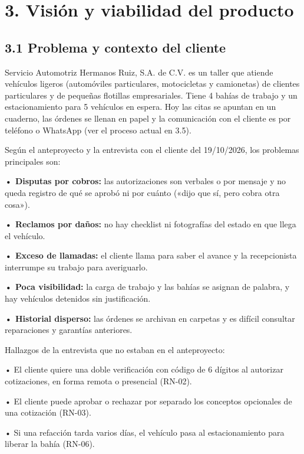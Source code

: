 \section{3. Visión y viabilidad del
producto}\label{visiuxf3n-y-viabilidad-del-producto}

\subsection{3.1 Problema y contexto del
cliente}\label{problema-y-contexto-del-cliente}

Servicio Automotriz Hermanos Ruiz, S.A. de C.V. es un taller que atiende
vehículos ligeros (automóviles particulares, motocicletas y camionetas)
de clientes particulares y de pequeñas flotillas empresariales. Tiene 4
bahías de trabajo y un estacionamiento para 5 vehículos en espera. Hoy
las citas se apuntan en un cuaderno, las órdenes se llenan en papel y la
comunicación con el cliente es por teléfono o WhatsApp (ver el proceso
actual en 3.5).

Según el anteproyecto y la entrevista con el cliente del 19/10/2026, los
problemas principales son:

\textbf{• Disputas por cobros:} las autorizaciones son verbales o por
mensaje y no queda registro de qué se aprobó ni por cuánto («dijo que
sí, pero cobra otra cosa»).

\textbf{• Reclamos por daños:} no hay checklist ni fotografías del
estado en que llega el vehículo.

\textbf{• Exceso de llamadas:} el cliente llama para saber el avance y
la recepcionista interrumpe su trabajo para averiguarlo.

\textbf{• Poca visibilidad:} la carga de trabajo y las bahías se asignan
de palabra, y hay vehículos detenidos sin justificación.

\textbf{• Historial disperso:} las órdenes se archivan en carpetas y es
difícil consultar reparaciones y garantías anteriores.

Hallazgos de la entrevista que no estaban en el anteproyecto:

• El cliente quiere una doble verificación con código de 6 dígitos al
autorizar cotizaciones, en forma remota o presencial (RN-02).

• El cliente puede aprobar o rechazar por separado los conceptos
opcionales de una cotización (RN-03).

• Si una refacción tarda varios días, el vehículo pasa al
estacionamiento para liberar la bahía (RN-06).

